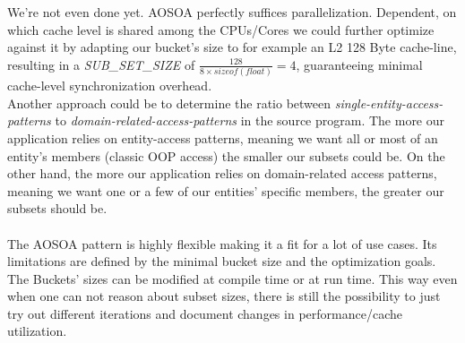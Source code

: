 We're not even done yet. AOSOA  perfectly suffices parallelization. Dependent, on which cache level is shared among the CPUs/Cores we could further optimize against it by adapting our bucket's size to for example an L2 128 Byte cache-line, resulting in a \textit{SUB\_SET\_SIZE} of $\frac{128}{8\times sizeof(float)} = 4$, guaranteeing minimal cache-level synchronization overhead.\\
Another approach could be to determine the ratio between \textit{single-entity-access-patterns} to \textit{domain-related-access-patterns} in the source program. The more our application relies on entity-access patterns, meaning we want all or most of an entity's members (classic OOP access) the smaller our subsets could be. On the other hand, the more our application relies on domain-related access patterns, meaning we want one or a few of our entities' specific members, the greater our subsets should be.\\\\
The AOSOA pattern is highly flexible making it a fit for a lot of use cases. Its limitations are defined by the minimal bucket size and the optimization goals. The Buckets' sizes can be modified at compile time or at run time. This way even when one can not reason about subset sizes, there is still the possibility to just try out different iterations and document changes in performance/cache utilization.

